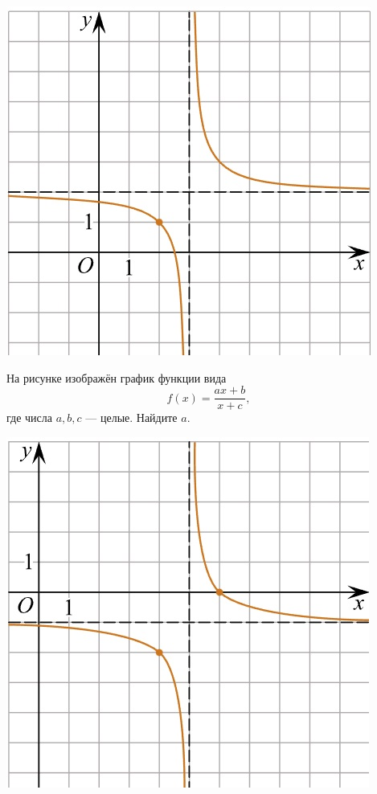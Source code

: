 \begin{class}[number=5]
\begin{listofex}
\begin{minipage}[t]{\picwidth}
			\includegraphics[align=t, width=\linewidth]{pics/G101M4C5-4.jpg}
		\end{minipage}
		\item
		\begin{minipage}[t]{\bodywidth}
			На рисунке изображён график функции вида \[ f(x)=\dfrac{ax+b}{x+c}, \] где числа \(a, b, c\) --- целые. Найдите \(a\).
		\end{minipage}
		\hspace{0.05\linewidth}
		\begin{minipage}[t]{\picwidth}
			\includegraphics[align=t, width=\linewidth]{pics/G101M4C5-5.jpg}

\end{minipage}
\end{listofex}
\end{class}
